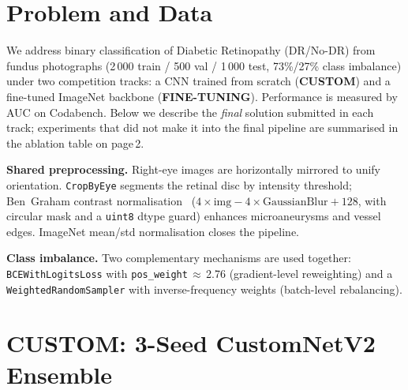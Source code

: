 \documentclass[a4paper, 10pt, twocolumn]{article}
\begin{document}

\section{Problem and Data}

We address binary classification of Diabetic Retinopathy (DR/No-DR) from
fundus photographs (2\,000 train / 500 val / 1\,000 test, 73\%/27\%
class imbalance) under two competition tracks: a CNN trained from scratch
(\textbf{CUSTOM}) and a fine-tuned ImageNet backbone (\textbf{FINE-TUNING}).
Performance is measured by AUC on Codabench. Below we describe the
\emph{final} solution submitted in each track; experiments that did not
make it into the final pipeline are summarised in the ablation table on
page\,2.

\textbf{Shared preprocessing.} Right-eye images are horizontally mirrored
to unify orientation. \texttt{CropByEye} segments the retinal disc by
intensity threshold; Ben~Graham contrast normalisation~\cite{graham2015kaggle}
($4{\times}\text{img}-4{\times}\text{GaussianBlur}+128$, with circular
mask and a \texttt{uint8} dtype guard) enhances microaneurysms and vessel
edges. ImageNet mean/std normalisation closes the pipeline.

\textbf{Class imbalance.} Two complementary mechanisms are used together:
\texttt{BCEWithLogitsLoss} with \texttt{pos\_weight}\,$\approx$\,2.76
(gradient-level reweighting) and a \texttt{WeightedRandomSampler} with
inverse-frequency weights (batch-level rebalancing).

\section{CUSTOM: 3-Seed CustomNetV2 Ensemble}
\end{document}
